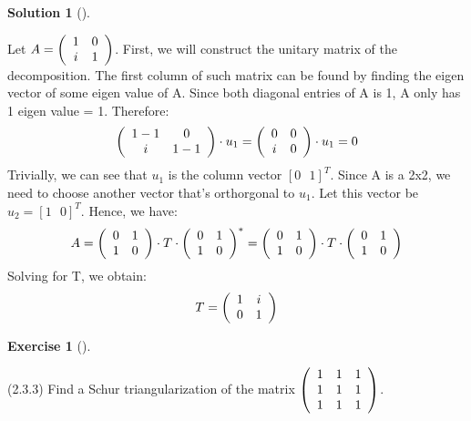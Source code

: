 \documentclass[numbers=enddot,12pt,final,onecolumn,notitlepage]{scrartcl}
\newcounter{exer}
\newcounter{sol}
\theoremstyle{definition}
\newtheorem{exmp}[exer]{Exercise}
\newenvironment{exercise}[1][]
{\begin{exmp}[#1]\begin{leftbar}}
        {\end{leftbar}\end{exmp}}
\newtheorem{solu}[sol]{Solution}
\newenvironment{solution}[1][]
{\begin{solu}[#1]\begin{leftbar}}
        {\end{leftbar}\end{solu}}
\begin{document}
\begin{solution}
	Let $A = \left(
		\begin{array}
				[c]{cc}%
				1 & 0 \\
				i & 1
			\end{array}
		\right)$.
	First, we will construct the unitary matrix of the decomposition. The first column of such matrix can be found by finding the eigen vector of some eigen value of A. Since both diagonal entries of A is 1, A only has 1 eigen value = 1. Therefore:
	\[
		\left(
		\begin{array}
				[c]{cc}%
				1-1 & 0   \\
				i   & 1-1
			\end{array}
		\right)\cdot u_1 =
		\left(
		\begin{array}
				[c]{cc}%
				0 & 0 \\
				i & 0
			\end{array}
		\right)\cdot u_1 = 0
	\]
	Trivially, we can see that $u_1$ is the column vector $[0 \text{  } 1]^{T}$. Since A is a 2x2, we need to choose another vector that's orthorgonal to $u_1$. Let this vector be $u_2 = [1 \text{  } 0]^{T}$. Hence, we have:
	\[
		A = \left(\begin{array}
				[c]{cc}%
				0 & 1 \\
				1 & 0
			\end{array}\right) \cdot T \cdot
		\left(\begin{array}
			[c]{cc}%
			0 & 1 \\
			1 & 0
		\end{array}\right)^{\ast} =
		\left(\begin{array}
				[c]{cc}%
				0 & 1 \\
				1 & 0
			\end{array}\right) \cdot T \cdot
		\left(\begin{array}
				[c]{cc}%
				0 & 1 \\
				1 & 0
			\end{array}\right)
	\]
	Solving for T, we obtain:
	\[
		T = \left(\begin{array}
				[c]{cc}%
				1 & i \\
				0 & 1
			\end{array}\right)
	\]

\end{solution}

\begin{exercise}
	\label{exe.schurtri.schurtri.one3x3} (2.3.3) Find a Schur triangularization of
	the matrix $\left(
		\begin{array}
				[c]{ccc}%
				1 & 1 & 1 \\
				1 & 1 & 1 \\
				1 & 1 & 1
			\end{array}
		\right)  $.
\end{exercise}
\end{document}
